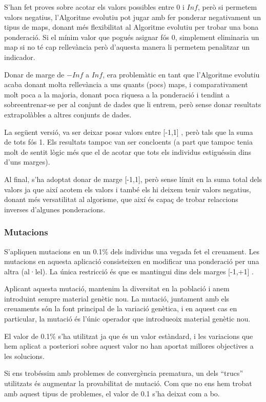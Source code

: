 \documentclass[titlepage,a4paper,12pt]{book}
\begin{document}
S'han fet proves sobre acotar els valors possibles entre 0 i $Inf$, però si
permetem valors negatius, l'Algoritme evolutiu pot jugar amb fer ponderar
negativament un tipus de maps, donant més flexibilitat al Algoritme evolutiu per
trobar una bona ponderació.  Si el mínim valor que pogués asignar fós 0,
simplement eliminaria un map si no té cap rellevància però d'aquesta manera li
permetem penalitzar un indicador.

Donar de marge de $-Inf$ a $Inf$, era problemàtic en tant que l'Algoritme
evolutiu acaba donant molta rellevància a uns quants (pocs) maps, i
comparativament molt poca a la majoria, donant poca riquesa a la ponderació i
tendint a sobreentrenar-se per al conjunt de dades que li entrem, però sense
donar resultats extrapolàbles a altres conjunts de dades.

La següent versió, va ser deixar posar valors entre [-1,1] , però tals que la
suma de tots fós 1.  Els resultats tampoc van ser concloents (a part que tampoc
tenia molt de sentit lògic més que el de acotar que tots els individus
estiguéssin dins d'uns marges).

Al final, s'ha adoptat donar de marge [-1,1], però sense límit en la suma total
dels valors ja que així acotem els valors i també els hi deixem tenir valors
negatius, donant més versatilitat al algorisme, que així és capaç de trobar
relaccions inverses d'algunes ponderacions.


\subsubsection{Mutacions} %
\label{ssub:Mutacions}

S'apliquen mutacions en un 0.1\% dels individus una vegada fet el creuament.
Les mutacions en aquesta aplicació consisteixen en modificar una ponderació per
una altra (al·lel).  La única restricció és que es mantingui dins dels marges
[-1,+1] .  

Aplicant aquesta mutació, mantenim la diversitat en la població i anem
introduint sempre material genètic nou.  La mutació, juntament amb els
creuaments són la font principal de la variació genètica, i en aquest cas en
particular, la mutació és l'únic operador que introdueoix material genètic nou.

El valor de 0.1\% s'ha utilitzat ja que és un valor estàndard, i les variacions
que hem aplicat a posteriori sobre aquest valor no han aportat millores
objectives a les solucions.

Si ens trobéssim amb problemes de convergència prematura, un dels ``trucs''
utilitzats és augmentar la provabilitat de mutació.  Com que no ens hem trobat
amb aquest tipus de problemes, el valor de 0.1 s'ha deixat com a bo.
\end{document}
